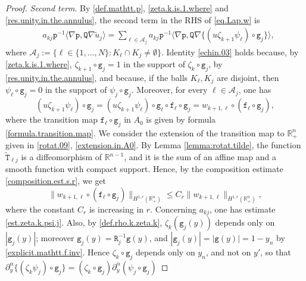 \documentclass[10pt,reqno,a4paper]{article}
\numberwithin{equation}{section}
\theoremstyle{plain}
\theoremstyle{definition}
\newcommand{\R}{{\mathbb R}}
\newcommand{\mA}{\mathcal{A}}
\renewcommand{\a}{\alpha}
\newcommand{\la}{\langle}
\newcommand{\ra}{\rangle}
\newcommand{\pa}{\partial}
\newcommand{\grad}{\nabla}
\begin{document}
\begin{proof}
\emph{Second term}. 
By \eqref{def.mathtt.p}, 
\eqref{zeta.k.is.1.where} and \eqref{res.unity.in.the.annulus}, 
the second term in the RHS of \eqref{eq.Lap.w} is 
\begin{align}
& a_{kj} \mathtt p^{-1} 
\la \grad \mathtt p , \mathtt Q \grad \tilde u_{j} \ra
= \sum_{\ell \in \mA_j} a_{kj} \mathtt p^{-1} \la \grad \mathtt p , \mathtt Q \grad 
\{ (u \zeta_{k+1} \psi_\ell) \circ \mathtt g_j \} \ra,
\label{echin.03}
\end{align}
where $\mA_j := \{ \ell \in \{ 1, \ldots, N \} : K_\ell \cap K_j \neq \emptyset \}$. 
Identity \eqref{echin.03} holds because, by \eqref{zeta.k.is.1.where}, 
$\zeta_{k+1} \circ \mathtt g_j = 1$ in the support of $\zeta_k \circ \mathtt g_j$, 
by \eqref{res.unity.in.the.annulus},  
and because, if the balls $K_\ell, K_j$ are disjoint, 
then $\psi_\ell \circ \mathtt g_j = 0$ in the support of $\psi_j \circ \mathtt g_j$. 
Moreover, for every $\ell \in \mA_j$, one has 
\begin{equation} \label{transition.w}
(u \zeta_{k+1} \psi_\ell) \circ \mathtt g_j 
= (u \zeta_{k+1} \psi_\ell) \circ \mathtt g_\ell \circ \mathtt f_\ell \circ \mathtt g_j
= w_{k+1,\ell} \circ (\mathtt f_\ell \circ \mathtt g_j),
\end{equation}
where the transition map $\mathtt f_\ell \circ \mathtt g_j$ 
in $A_0$ is given by formula \eqref{formula.transition.map}.
We consider the extension of the transition map to $\R^n_+$ 
given in \eqref{rotat.09}, \eqref{extension.in.A0}. 
By Lemma \ref{lemma:rotat.tilde}, the function $\tilde{\mathtt T}_{\ell j}$ 
is a diffeomorphism of $\R^{n-1}$, and it is the sum 
of an affine map and a smooth function with compact support. 
Hence, by the composition estimate \eqref{composition.est.s.r}, we get
\begin{equation}  \label{echin.04}
\| w_{k+1,\ell} \circ (\mathtt f_\ell \circ \mathtt g_j) \|_{H^{1,r}(\R^n_+)}
\leq C_r \|  w_{k+1,\ell} \|_{H^{1,r}(\R^n_+)},
\end{equation}
where the constant $C_r$ is increasing in $r$. 
Concerning $a_{kj}$, one has estimate \eqref{est.zeta.k.psi.j}. 
Also, by \eqref{def.rho.k.zeta.k}, 
$\zeta_k(\mathtt g_j(y))$ depends only on $|\mathtt g_j(y)|$; 
moreover $\mathtt g_j(y) = \mathtt R_j^{-1} \mathtt g(y)$, 
and $|\mathtt g_j(y)| = |\mathtt g(y)| = 1 - y_n$ by \eqref{explicit.mathtt.f.inv}.  
Hence $\zeta_k \circ \mathtt g_j$ depends only on $y_n$, and not on $y'$, 
so that $\pa_y^\a \{ (\zeta_k \psi_j) \circ \mathtt g_j \} 
= (\zeta_k \circ \mathtt g_j) \pa_y^\a (\psi_j \circ \mathtt g_j)$ 

\end{proof}
\end{document}
